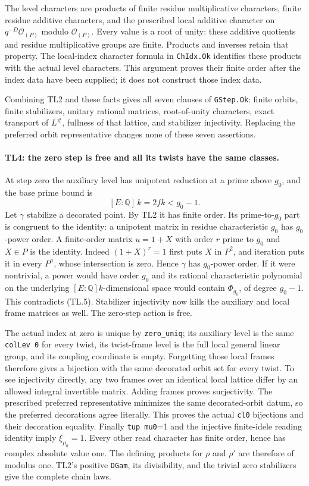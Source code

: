 \documentclass[11pt,a4paper]{article}
\numberwithin{equation}{section}
\theoremstyle{remark}\newtheorem{remark}[theorem]{Remark}
\begin{document}
The level characters are products of finite residue multiplicative
characters, finite residue additive characters, and the prescribed
local additive character on $q^{-D}\mathcal O_{(P)}$ modulo
$\mathcal O_{(P)}$. Every value is a root of unity: these additive
quotients and residue multiplicative groups are finite. Products and
inverses retain that property. The local-index character formula in
\texttt{ChIdx.Ok} identifies these products with the actual level
characters. This argument proves their finite order after the index
data have been supplied; it does not construct those index data.

Combining TL2 and these facts gives all seven clauses of
\texttt{GStep.Ok}: finite orbits, finite stabilizers, unitary rational
matrices, root-of-unity characters, exact transport of $L^\#$, fullness
of that lattice, and stabilizer injectivity. Replacing the preferred
orbit representative changes none of these seven assertions.

\paragraph{TL4: the zero step is free and all its twists have the same
classes.}
At step zero the auxiliary level has unipotent reduction at a prime
above $g_0$, and the base prime bound is
\[
 [E:\mathbb Q]\,k=2fk<g_0-1.                     \tag{TL.5}
\]
Let $\gamma$ stabilize a decorated point. By TL2 it has finite order.
Its prime-to-$g_0$ part is congruent to the identity: a unipotent
matrix in residue characteristic $g_0$ has $g_0$-power order. A
finite-order matrix $u=1+X$ with order $r$ prime to $g_0$ and
$X\in P$ is the identity. Indeed $(1+X)^r=1$ first puts $X$ in
$P^2$, and iteration puts it in every $P^a$, whose intersection is
zero. Hence $\gamma$ has $g_0$-power order. If it were nontrivial,
a power would have order $g_0$ and its rational characteristic
polynomial on the underlying $[E:\mathbb Q]k$-dimensional space
would contain $\Phi_{g_0}$, of degree $g_0-1$. This contradicts
(TL.5). Stabilizer injectivity now kills the auxiliary and local
frame matrices as well. The zero-step action is free.

The actual index at zero is unique by \texttt{zero\_\allowbreak uniq}; its
auxiliary level is the same \texttt{colLev 0} for every twist, its
twist-frame level is the full local general linear group, and its
coupling coordinate is empty. Forgetting those local frames
therefore gives a bijection with the same decorated orbit set for
every twist. To see injectivity directly, any two frames over an
identical local lattice differ by an allowed integral invertible
matrix. Adding frames proves surjectivity. The prescribed preferred
representative minimizes the same decorated-orbit datum, so the
preferred decorations agree literally. This proves the actual
\texttt{cl0} bijections and their decoration equality.
Finally \texttt{tup mu0}=1 and the injective finite-idele reading
identity imply $\xi_{\mu_0}=1$. Every other read character has finite
order, hence has complex absolute value one. The defining products
for $\rho$ and $\rho'$ are therefore of modulus one. TL2's positive
\texttt{DGam}, its divisibility, and the trivial zero stabilizers
give the complete chain laws.
\end{document}
